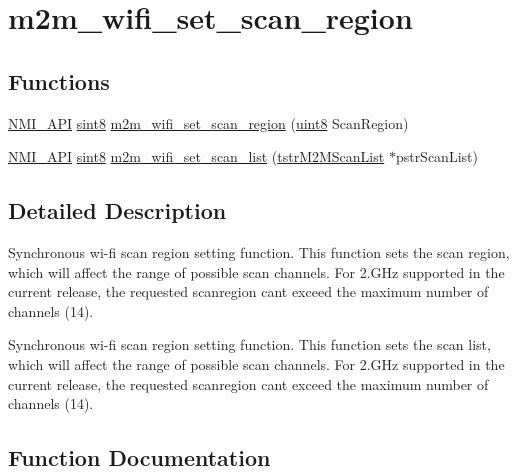 \hypertarget{group__WifiSetScanRegionFn}{}\section{m2m\+\_\+wifi\+\_\+set\+\_\+scan\+\_\+region}
\label{group__WifiSetScanRegionFn}
\subsection*{Functions}
\begin{DoxyCompactItemize}
\item 
\hyperlink{group__BSPDefine_gaecc0323d771e41ef81a76b5f12783e22}{N\+M\+I\+\_\+\+A\+PI} \hyperlink{group__DataT_gae35f10ffd0ac8dd2bc3e794da9bdfbc7}{sint8} \hyperlink{group__WifiSetScanRegionFn_ga68c36d05bbbec08c800137eabddb6d92}{m2m\+\_\+wifi\+\_\+set\+\_\+scan\+\_\+region} (\hyperlink{group__DataT_ga4df709a77647e870bbf1d955b8edc9a6}{uint8} Scan\+Region)
\item 
\hyperlink{group__BSPDefine_gaecc0323d771e41ef81a76b5f12783e22}{N\+M\+I\+\_\+\+A\+PI} \hyperlink{group__DataT_gae35f10ffd0ac8dd2bc3e794da9bdfbc7}{sint8} \hyperlink{group__WifiSetScanRegionFn_gace941c5ceb0d191e1605b85f0a8dcb73}{m2m\+\_\+wifi\+\_\+set\+\_\+scan\+\_\+list} (\hyperlink{structtstrM2MScanList}{tstr\+M2\+M\+Scan\+List} $\ast$pstr\+Scan\+List)
\end{DoxyCompactItemize}


\subsection{Detailed Description}
Synchronous wi-\/fi scan region setting function. This function sets the scan region, which will affect the range of possible scan channels. For 2.\+G\+Hz supported in the current release, the requested scanregion can\textquotesingle{}t exceed the maximum number of channels (14).

Synchronous wi-\/fi scan region setting function. This function sets the scan list, which will affect the range of possible scan channels. For 2.\+G\+Hz supported in the current release, the requested scanregion can\textquotesingle{}t exceed the maximum number of channels (14). 

\subsection{Function Documentation}
\mbox{\label{group__WifiSetScanRegionFn_gace941c5ceb0d191e1605b85f0a8dcb73}} 
